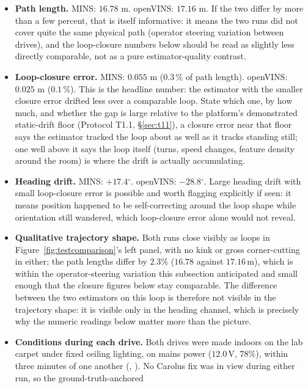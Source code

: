 \begin{itemize}
\item \textbf{Path length.} MINS: $16.78$ m. openVINS:
  $17.16$ m. If the two differ by more than a few percent, that is
  itself informative: it means the two runs did not cover quite the same
  physical path (operator steering variation between drives), and the
  loop-closure numbers below should be read as slightly less directly
  comparable, not as a pure estimator-quality contrast.
\item \textbf{Loop-closure error.} MINS: $0.055$ m
  ($0.3$\,\% of path length). openVINS:
  $0.025$ m ($0.1$\,\%). This is the headline
  number: the estimator with the smaller closure error drifted less over a
  comparable loop. State which one, by how much, and whether the gap is
  large relative to the platform's demonstrated static-drift floor
  (Protocol T1.1, \S\ref{sec:t11}), a closure error near that floor says
  the estimator tracked the loop about as well as it tracks standing still;
  one well above it says the loop itself (turns, speed changes, feature
  density around the room) is where the drift is actually accumulating.
\item \textbf{Heading drift.} MINS: $+17.4$$^\circ$. openVINS:
  $-28.8$$^\circ$. Large heading drift with small loop-closure
  error is possible and worth flagging explicitly if seen: it means
  position happened to be self-correcting around the loop shape while
  orientation still wandered, which loop-closure error alone would not
  reveal.
\item \textbf{Qualitative trajectory shape.} Both runs close visibly as
  loops in Figure~\ref{fig:testcomparison}'s left panel, with no kink or
  gross corner-cutting in either; the path lengths differ by $2.3\%$
  ($16.78$ against $17.16$\,m), which is within the operator-steering
  variation this subsection anticipated and small enough that the closure
  figures below stay comparable. The difference between the two estimators
  on this loop is therefore not visible in the trajectory shape: it is
  visible only in the heading channel, which is precisely why the numeric
  readings below matter more than the picture.
\item \textbf{Conditions during each drive.} Both drives were made
  indoors on the lab carpet under fixed ceiling lighting, on mains power
  ($12.0$\,V, $78\%$), within three minutes of one another
  (, ). No
  Carolus fix was in view during either run, so the ground-truth-anchored

\end{itemize}

